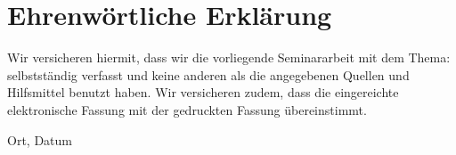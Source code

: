 
\clearpage
\chapter*{Ehrenwörtliche Erklärung}


Wir versicheren hiermit, dass wir die vorliegende Seminararbeit
 mit dem Thema: \textit{\DerTitelDerArbeit} selbstständig verfasst und keine anderen als die angegebenen Quellen und
Hilfsmittel benutzt haben. Wir versicheren zudem,
dass die eingereichte elektronische Fassung mit der gedruckten Fassung übereinstimmt.

\vspace{4cm}
Ort, Datum 